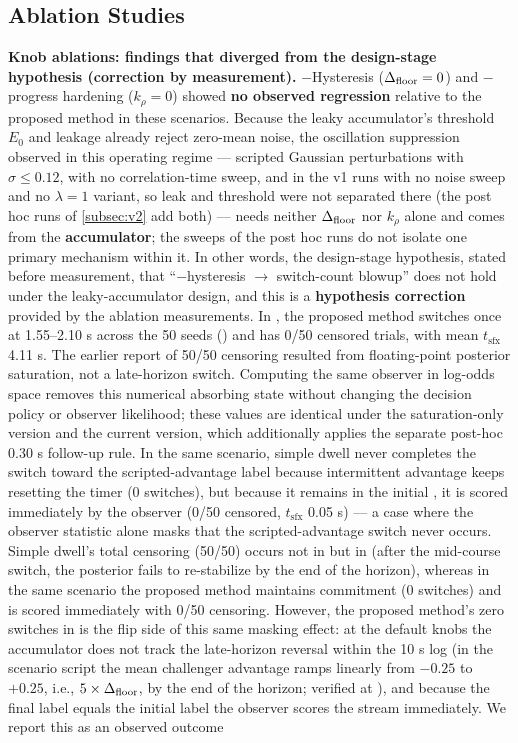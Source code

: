 \subsection{Ablation Studies}\label{subsec:ablation}



\noindent\textbf{Knob ablations: findings that diverged from the design-stage hypothesis (correction by measurement).} $-$Hysteresis ($\Delta_{\text{floor}} = 0$) and $-$progress hardening ($k_\rho = 0$) showed \textbf{no observed regression} relative to the proposed method in these scenarios. Because the leaky accumulator's threshold $E_0$ and leakage already reject zero-mean noise, the oscillation suppression observed in this operating regime --- scripted Gaussian perturbations with $\sigma\le0.12$, with no correlation-time sweep, and in the v1 runs with no noise sweep and no $\lambda=1$ variant, so leak and threshold were not separated there (the post hoc runs of \cref{subsec:v2} add both) --- needs neither $\Delta_{\text{floor}}$ nor $k_\rho$ alone and comes from the \textbf{accumulator}; the sweeps of the post hoc runs do not isolate one primary mechanism within it. In other words, the design-stage hypothesis, stated before measurement, that ``$-$hysteresis $\to$ switch-count blowup'' does not hold under the leaky-accumulator design, and this is a \textbf{hypothesis correction} provided by the ablation measurements. In , the proposed method switches once at 1.55--2.10 s across the 50 seeds () and has 0/50 censored trials, with mean $t_{\text{sfx}}$ 4.11 s. The earlier report of 50/50 censoring resulted from floating-point posterior saturation, not a late-horizon switch. Computing the same observer in log-odds space removes this numerical absorbing state without changing the decision policy or observer likelihood; these  values are identical under the saturation-only version and the current version, which additionally applies the separate post-hoc 0.30 s follow-up rule. In the same scenario, simple dwell never completes the switch toward the scripted-advantage label because intermittent advantage keeps resetting the timer (0 switches), but because it remains in the initial \Class, it is scored immediately by the observer (0/50 censored, $t_{\text{sfx}}$ 0.05 s) --- a case where the observer statistic alone masks that the scripted-advantage switch never occurs. Simple dwell's total censoring (50/50) occurs not in  but in  (after the mid-course switch, the posterior fails to re-stabilize by the end of the horizon), whereas in the same scenario the proposed method maintains commitment (0 switches) and is scored immediately with 0/50 censoring. However, the proposed method's zero switches in  is the flip side of this same masking effect: at the default knobs the accumulator does not track the late-horizon reversal within the 10 s log (in the scenario script the mean challenger advantage ramps linearly from $-0.25$ to $+0.25$, i.e., $5\times\Delta_{\text{floor}}$, by the end of the horizon; verified at ), and because the final label equals the initial label the observer scores the stream immediately. We report this as an observed outcome 